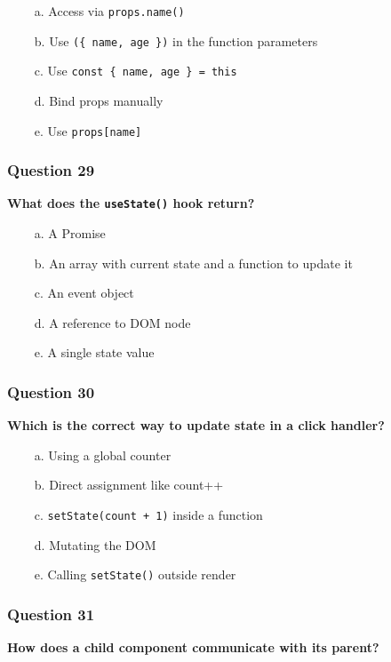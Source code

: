 \documentclass{article}
\newcommand{\cmark}{\textcolor{green}{\ding{51}}} %
\newcommand{\xmark}{\textcolor{red}{\ding{55}}}   %
\begin{document}
\begin{itemize}
  \item[\xmark\ a.] Access via \texttt{props.name()}
  \item[\cmark\ b.] Use \texttt{(\{ name, age \})} in the function parameters
  \item[\xmark\ c.] Use \texttt{const \{ name, age \} = this}
  \item[\xmark\ d.] Bind props manually
  \item[\xmark\ e.] Use \texttt{props[name]}
\end{itemize}

\subsubsection*{Question 29}
\textbf{What does the \texttt{useState()} hook return?}

\begin{itemize}
  \item[\xmark\ a.] A Promise
  \item[\cmark\ b.] An array with current state and a function to update it
  \item[\xmark\ c.] An event object
  \item[\xmark\ d.] A reference to DOM node
  \item[\xmark\ e.] A single state value
\end{itemize}

\subsubsection*{Question 30}
\textbf{Which is the correct way to update state in a click handler?}

\begin{itemize}
  \item[\xmark\ a.] Using a global counter
  \item[\xmark\ b.] Direct assignment like count++
  \item[\cmark\ c.] \texttt{setState(count + 1)} inside a function
  \item[\xmark\ d.] Mutating the DOM
  \item[\xmark\ e.] Calling \texttt{setState()} outside render
\end{itemize}


\subsubsection*{Question 31}
\textbf{How does a child component communicate with its parent?}
\end{document}

